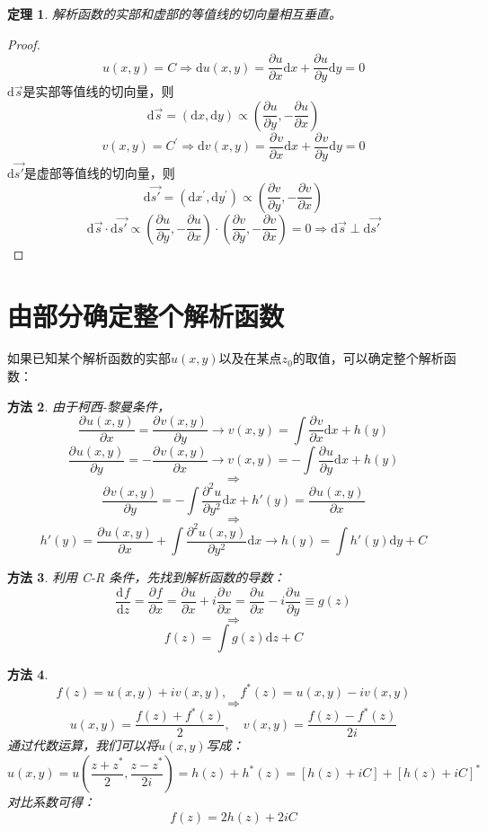 \documentclass[10pt, a4paper, oneside]{ctexbook}
\newtheorem{theorem}{定理}[section]
\newtheorem{method}[theorem]{方法}
\def\D{\mathrm{d}}
\newcommand{\partdev}[3][]
{\ensuremath{\frac{\displaystyle \partial^{#1} #2}{ \displaystyle \partial #3}}}
\newcommand{\dev}[3][]
{\ensuremath{\frac{\displaystyle \D^{#1} #2}{ \displaystyle \D #3}}}
\begin{document}
\begin{theorem}
    解析函数的实部和虚部的等值线的切向量相互垂直。
\end{theorem}
\begin{proof}
    \begin{equation*}
        u(x, y)=C \Rightarrow \D u(x, y)=\frac{\partial u}{\partial x} \D x+\frac{\partial u}{\partial y} \D y=0
    \end{equation*}
    $\D \vec{s}$是实部等值线的切向量，则
    \begin{equation*}
        \D \vec{s}=(\D x, \D y) \propto\left(\frac{\partial u}{\partial y},-\frac{\partial u}{\partial x}\right)
    \end{equation*}
    \begin{equation*}
        v(x, y)=C^{\prime} \Rightarrow \D v(x,y)=\partdev{v}{x} \D x + \partdev{v}{y}\D y =0
    \end{equation*}
    $\D \vec{s'}$是虚部等值线的切向量，则
    \begin{equation*}
        \D \vec{s'} =\left(\D x^{\prime}, \D y^{\prime}\right) \propto\left(\frac{\partial v}{\partial y},-\frac{\partial v}{\partial x}\right)
    \end{equation*}
    \begin{equation*}
        \D \vec{s} \cdot \D \vec{s'} \propto\left(\frac{\partial u}{\partial y},-\frac{\partial u}{\partial x}\right) \cdot\left(\frac{\partial v}{\partial y},-\frac{\partial v}{\partial x}\right)=0 \Rightarrow \D \vec{s} \perp \D \vec{s'}
    \end{equation*}
\end{proof}
\section{由部分确定整个解析函数}
如果已知某个解析函数的实部$u(x,y)$以及在某点$z_0$的取值，可以确定整个解析函数：
\begin{method}
    由于柯西-黎曼条件，
$$\partdev{u(x,y)}{x}=\partdev{v(x,y)}{y}\to v(x,y)=\int \partdev{v}{x}\D x + h(y)$$
$$\partdev{u(x,y)}{y}=-\partdev{v(x,y)}{x}\to v(x,y)=-\int \partdev{u}{y}\D x + h(y)$$
$$\Rightarrow$$
$$\partdev{v(x,y)}{y}=-\int \partdev[2]{u}{y^2} \D x+h'(y)=\partdev{u(x,y)}{x}$$
$$\Rightarrow$$
$$h'(y)=\partdev{u(x,y)}{x}+\int \partdev[2]{u(x,y)}{y^2}\D x\to h(y)=\int h'(y)\D y + C$$
\end{method}
\begin{method}
    利用 C-R 条件，先找到解析函数的导数：
    $$\dev{f}{z}=\partdev{f}{x}=\partdev{u}{x}+i\partdev{v}{x}=\partdev{u}{x}-i\partdev{u}{y} \equiv g(z)$$
    $$\Rightarrow$$
    $$f(z)=\int g(z)\D z + C$$
\end{method}
\begin{method}
    $$f(z)=u(x,y)+iv(x,y),\quad f^*(z)=u(x,y)-iv(x,y)$$
    $$\Rightarrow$$
    $$u(x,y)=\frac{f(z)+f^*(z)}{2},\quad v(x,y)=\frac{f(z)-f^*(z)}{2i}$$
    通过代数运算，我们可以将$u(x,y)$写成：
    $$u(x,y)=u\left(\frac{z+z^*}{2},\frac{z-z^*}{2i}\right)=h(z)+h^*(z)=\left[h(z)+iC\right]+\left[h(z)+iC\right]^*$$
    对比系数可得：
    $$f(z)=2h(z)+2iC$$
\end{method}
\end{document}
